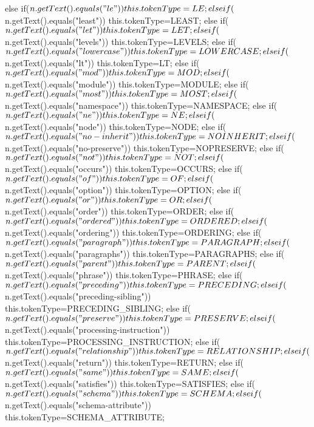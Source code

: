 {{         else if($n.getText().equals("le")) this.tokenType=LE;
         else if($n.getText().equals("least")) this.tokenType=LEAST;
         else if($n.getText().equals("let")) this.tokenType=LET;
         else if($n.getText().equals("levels")) this.tokenType=LEVELS;
         else if($n.getText().equals("lowercase")) this.tokenType=LOWERCASE;
         else if($n.getText().equals("lt")) this.tokenType=LT;
         else if($n.getText().equals("mod")) this.tokenType=MOD;
         else if($n.getText().equals("module")) this.tokenType=MODULE;
         else if($n.getText().equals("most")) this.tokenType=MOST;
         else if($n.getText().equals("namespace")) this.tokenType=NAMESPACE;
         else if($n.getText().equals("ne")) this.tokenType=NE;
         else if($n.getText().equals("node")) this.tokenType=NODE;
         else if($n.getText().equals("no-inherit")) this.tokenType=NOINHERIT;
         else if($n.getText().equals("no-preserve")) this.tokenType=NOPRESERVE;
         else if($n.getText().equals("not")) this.tokenType=NOT;
         else if($n.getText().equals("occurs")) this.tokenType=OCCURS;
         else if($n.getText().equals("of")) this.tokenType=OF;
         else if($n.getText().equals("option")) this.tokenType=OPTION;
         else if($n.getText().equals("or")) this.tokenType=OR;
         else if($n.getText().equals("order")) this.tokenType=ORDER;
         else if($n.getText().equals("ordered")) this.tokenType=ORDERED;
         else if($n.getText().equals("ordering")) this.tokenType=ORDERING;
         else if($n.getText().equals("paragraph")) this.tokenType=PARAGRAPH;
         else if($n.getText().equals("paragraphs")) this.tokenType=PARAGRAPHS;
         else if($n.getText().equals("parent")) this.tokenType=PARENT;
         else if($n.getText().equals("phrase")) this.tokenType=PHRASE;
         else if($n.getText().equals("preceding")) this.tokenType=PRECEDING;
         else if($n.getText().equals("preceding-sibling")) this.tokenType=PRECEDING_SIBLING;
         else if($n.getText().equals("preserve")) this.tokenType=PRESERVE;
         else if($n.getText().equals("processing-instruction")) this.tokenType=PROCESSING_INSTRUCTION;
         else if($n.getText().equals("relationship")) this.tokenType=RELATIONSHIP;
         else if($n.getText().equals("return")) this.tokenType=RETURN;
         else if($n.getText().equals("same")) this.tokenType=SAME;
         else if($n.getText().equals("satisfies")) this.tokenType=SATISFIES;
         else if($n.getText().equals("schema")) this.tokenType=SCHEMA;
         else if($n.getText().equals("schema-attribute")) this.tokenType=SCHEMA_ATTRIBUTE;
}}
